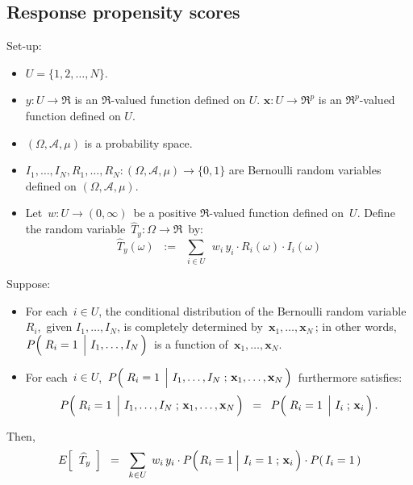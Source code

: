 

\subsection{Response propensity scores}

\begin{proposition}\label{PropnPropensityScore} 
\mbox{}\vskip 0.25cm
\noindent
Set-up:
\begin{itemize}
\item
	$U = \{1,2,\ldots,N\}$.
\item
	$y : U \longrightarrow \Re$ is an $\Re$-valued function defined on $U$.\;
	$\mathbf{x} : U \longrightarrow \Re^{p}$ is an $\Re^{p}$-valued function defined on $U$.
\item
	$(\Omega,\mathcal{A},\mu)$ is a probability space.
\item
	$I_{1},\ldots,I_{N},R_{1},\ldots,R_{N} : (\Omega,\mathcal{A},\mu) \longrightarrow \{0,1\}$
	are Bernoulli random variables defined on $(\Omega,\mathcal{A},\mu)$. 
\item
	Let \,$w : U \longrightarrow (0,\infty)$\, be a positive $\Re$-valued function defined on \,$U$.
	\vskip 0.05cm
	Define the random variable \,$\widehat{T}_{y} : \Omega \longrightarrow \Re$\, by:
	\begin{equation*}
	\widehat{T}_{y}(\omega)
	\;\; := \;\;
		\underset{i \in U}{\sum}\,\;w_{i}\,y_{i}\cdot R_{i}(\omega) \cdot I_{i}(\omega)
	\end{equation*}
\end{itemize}
Suppose:
\begin{itemize}
\item
	For each \,$i \in U$, the conditional distribution of the Bernoulli random variable
	\,$R_{i}$,\, given $I_{1},\ldots,I_{N}$, is completely determined by
	\,$\mathbf{x}_{1}, \ldots, \mathbf{x}_{N}$\,;
	in other words,
	\,$P\!\left(\,\left.\overset{{\color{white}.}}{R_{i}}=1\;\,\right\vert\,I_{1},\ldots,I_{N}\,\right)$\,
	is a function of \,$\mathbf{x}_{1},\ldots,\mathbf{x}_{N}$.
\item
	For each \,$i \in U$,
	\,$P\!\left(\,
		\left.\overset{{\color{white}.}}{R_{i}}=1\;\,\right\vert\,
		I_{1},\ldots,I_{N}\;;\,\mathbf{x}_{1},\ldots,\mathbf{x}_{N}
		\,\right)$\,
	furthermore satisfies:
	\begin{equation*}
	P\!\left(\,
		\left.\overset{{\color{white}.}}{R_{i}}=1\;\,\right\vert\,
		I_{1},\ldots,I_{N}\;;\,\mathbf{x}_{1},\ldots,\mathbf{x}_{N}
		\,\right)
	\;\; = \;\;
		P\!\left(\,\left.\overset{{\color{white}.}}{R_{i}}=1\;\,\right\vert\,I_{i}\;;\,\mathbf{x}_{i}\,\right).
	\end{equation*}
\end{itemize}
Then,
\begin{equation*}
E\!\left[\;\;\widehat{T}_{y}\;\,\right]
\;\; = \;\;
	\underset{k \in U}{\sum}\;\,w_{i}\,y_{i}
	\cdot P\!\left(\left.\overset{{\color{white}.}}{R_{i}}=1\;\right\vert\,I_{i}=1\;;\,\mathbf{x}_{i}\,\right) 
	\cdot P(\,I_{i}=1\,)
\end{equation*}
\end{proposition}
